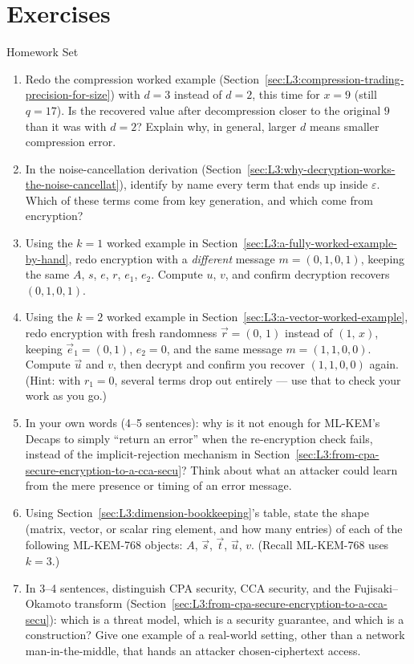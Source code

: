 \section{Exercises}
\label{sec:L3:exercises-assign-before-lecture-4}

\begin{exercisebox}{Homework Set}
\begin{enumerate}[leftmargin=*]
  \item Redo the compression worked example (Section~\ref{sec:L3:compression-trading-precision-for-size}) with $d=3$ instead of $d=2$, this time for $x=9$ (still $q=17$). Is the recovered value after decompression closer to the original $9$ than it was with $d=2$? Explain why, in general, larger $d$ means smaller compression error.
  \item In the noise-cancellation derivation (Section~\ref{sec:L3:why-decryption-works-the-noise-cancellat}), identify by name every term that ends up inside $\varepsilon$. Which of these terms come from key generation, and which come from encryption?
  \item Using the $k=1$ worked example in Section~\ref{sec:L3:a-fully-worked-example-by-hand}, redo encryption with a \emph{different} message $m=(0,1,0,1)$, keeping the same $A$, $s$, $e$, $r$, $e_1$, $e_2$. Compute $u$, $v$, and confirm decryption recovers $(0,1,0,1)$.
  \item Using the $k=2$ worked example in Section~\ref{sec:L3:a-vector-worked-example}, redo encryption with fresh randomness $\vec r=(0,\,1)$ instead of $(1,\,x)$, keeping $\vec e_1=(0,1)$, $e_2=0$, and the same message $m=(1,1,0,0)$. Compute $\vec u$ and $v$, then decrypt and confirm you recover $(1,1,0,0)$ again. (Hint: with $r_1=0$, several terms drop out entirely --- use that to check your work as you go.)
  \item In your own words (4--5 sentences): why is it not enough for ML-KEM's Decaps to simply ``return an error'' when the re-encryption check fails, instead of the implicit-rejection mechanism in Section~\ref{sec:L3:from-cpa-secure-encryption-to-a-cca-secu}? Think about what an attacker could learn from the mere presence or timing of an error message.
  \item Using Section~\ref{sec:L3:dimension-bookkeeping}'s table, state the shape (matrix, vector, or scalar ring element, and how many entries) of each of the following ML-KEM-768 objects: $A$, $\vec s$, $\vec t$, $\vec u$, $v$. (Recall ML-KEM-768 uses $k=3$.)
  \item In 3--4 sentences, distinguish CPA security, CCA security, and the Fujisaki--Okamoto transform (Section~\ref{sec:L3:from-cpa-secure-encryption-to-a-cca-secu}): which is a threat model, which is a security guarantee, and which is a construction? Give one example of a real-world setting, other than a network man-in-the-middle, that hands an attacker chosen-ciphertext access.

\end{enumerate}
\end{exercisebox}
